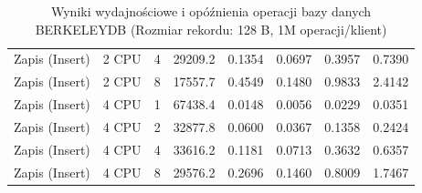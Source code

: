 \begin{table}[ht]
{\begin{tabular}{llcrrrrr}
Zapis (Insert) & 2 CPU & 4 & 29209.2 & 0.1354 & 0.0697 & 0.3957 & 0.7390 \\
Zapis (Insert) & 2 CPU & 8 & 17557.7 & 0.4549 & 0.1480 & 0.9833 & 2.4142 \\
Zapis (Insert) & 4 CPU & 1 & 67438.4 & 0.0148 & 0.0056 & 0.0229 & 0.0351 \\
Zapis (Insert) & 4 CPU & 2 & 32877.8 & 0.0600 & 0.0367 & 0.1358 & 0.2424 \\
Zapis (Insert) & 4 CPU & 4 & 33616.2 & 0.1181 & 0.0713 & 0.3632 & 0.6357 \\
Zapis (Insert) & 4 CPU & 8 & 29576.2 & 0.2696 & 0.1460 & 0.8009 & 1.7467 \\
\bottomrule
\end{tabular}%
}
\caption{Wyniki wydajnościowe i opóźnienia operacji bazy danych BERKELEYDB (Rozmiar rekordu: 128 B, 1M operacji/klient)}
\label{tab:latency_berkeleydb_small_1000000}
\end{table}
